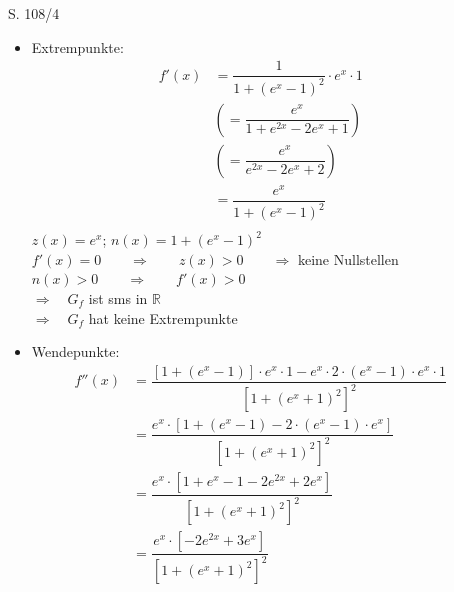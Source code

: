 \begin{Exercise}{S. 108/4}{}
\begin{enumerate}
\begin{enumerate}[label=\alph*),leftmargin=*]
{\begin{itemize}[leftmargin=*]
{\begin{itemize}
{                            $N_{1} \left( 0 \ / \ 0 \right)$
                            }
                    \end{itemize}
                    }
                \item Extrempunkte: \\[-3.0ex]{
                    \begin{align*}
                        f'(x) &= \dfrac{1}{1 + \left(e^{x} - 1\right)^{2}} \cdot e^{x} \cdot 1&&\\[1.5ex]
                        &\left(= \dfrac{e^{x}}{1 + e^{2x} - 2e^{x} +1}\right)&& \\[1.5ex]
                        &\left(= \dfrac{e^{x}}{e^{2x} - 2e^{x} + 2}\right)&& \\[1.5ex]
                        &= \dfrac{e^{x}}{1 + \left(e^{x} - 1\right)^{2}} &&\\[-2.0ex]
                    \end{align*}
                    $z(x) = e^{x}$; \qquad $n(x) = 1 + \left(e^{x} - 1\right)^{2}$\\[1.0ex]
                    $f'(x) = 0 \qquad \Rightarrow \qquad z(x) > 0 \qquad \Rightarrow$ \quad keine Nullstellen\\[1.0ex]
                    $n(x) > 0 \qquad \Rightarrow \qquad f'(x) > 0$\\[1.0ex]
                    $\Rightarrow \quad G_{f}$ ist sms in $\mathbb{R}$\\[1.0ex]
                    $\Rightarrow \quad G_{f}$ hat keine Extrempunkte\\[-2.0ex]
                    }
                \item Wendepunkte: \\[-2.0ex]{
                    \begin{align*}
                        f''(x) &= \dfrac{\left[1 + \left(e^{x} - 1\right)\right] \cdot e^{x} \cdot 1 - e^{x} \cdot 2 \cdot \left(e^{x} - 1\right) \cdot e^{x} \cdot 1}{\left[1 + \left(e^{x} + 1\right)^{2}\right]^{2}}&&\\[1.5ex]
                        &= \dfrac{e^{x} \cdot \left[1 + \left(e^{x} - 1\right) -  2 \cdot \left(e^{x} - 1\right) \cdot e^{x}\right]}{\left[1 + \left(e^{x} + 1\right)^{2}\right]^{2}}&&\\[1.5ex]
                        &= \dfrac{e^{x} \cdot \left[1 + e^{x} - 1 -  2e^{2x} + 2e^{x}\right]}{\left[1 + \left(e^{x} + 1\right)^{2}\right]^{2}}&&\\[1.5ex]
                        &= \dfrac{e^{x} \cdot \left[-2e^{2x} + 3e^{x}\right]}{\left[1 + \left(e^{x} + 1\right)^{2}\right]^{2}}&&\\[1.5ex]

\end{align*}}
\end{itemize}}
\end{enumerate}
\end{enumerate}
\end{Exercise}
